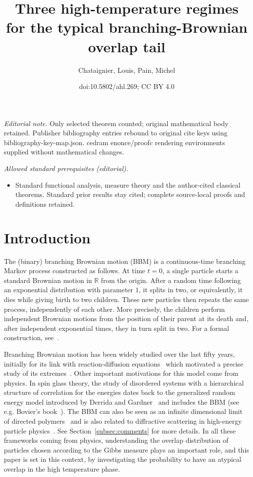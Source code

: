 \documentclass[10pt]{amsart}
\title{Three high-temperature regimes for the typical branching-Brownian overlap tail}
\author{Chataignier, Louis, Pain, Michel}
\date{doi:10.5802/ahl.269; CC BY 4.0}
\theoremstyle{definition}\newtheorem{defi}[theo]{Definition}\newtheorem{rema}[theo]{Remark}\newtheorem{exam}[theo]{Example}\newtheorem{exem}[theo]{Example}\newtheorem{nota}[theo]{Notation}
\newcommand{\R}{\mathbb{R}}
\newcommand\1{\mathds{1}}
\begin{document}
\maketitle
\noindent\textit{Editorial note.} Only selected theorem counted; original mathematical body retained. Publisher bibliography entries rebound to original cite keys using bibliography-key-map.json. cedram enonce/proofc rendering environments supplied without mathematical changes.\par\medskip
\noindent\textit{Allowed standard prerequisites (editorial).}\begin{itemize}
\item Standard functional analysis, measure theory and the author-cited classical theorems. Standard prior results stay cited; complete source-local proofs and definitions retained.
\end{itemize}\medskip

\tableofcontents

\section{Introduction}

The (binary) branching Brownian motion (BBM) is a continuous-time branching Markov process constructed as follows. At time $t = 0$, a single particle starts a standard Brownian motion in $\R$ from the origin. After a random time following an exponential distribution with parameter $1$, it splits in two, or equivalently, it dies while giving birth to two children. These new particles then repeats the same process, independently of each other. More precisely, the children perform independent Brownian motions from the position of their parent at its death and, after independent exponential times, they in turn split in two. For a formal construction, see~\cite{Chauvin1991}.

Branching Brownian motion has been widely studied over the last fifty years, initially for its link with reaction-diffusion equations~\cite{McKean1975} which motivated a precise study of its extremes~\cite{AidekonBerestyckiBrunetShi2013,ArguinBovierKistler2013,Bramson1978,Bramson1983,LalleySellke1987}. Other important motivations for this model come from physics. In spin glass theory, the study of disordered systems with a hierarchical structure of correlation for the energies dates back to the generalized random energy model introduced by Derrida and Gardner~\cite{DerridaGardner1986} and includes the BBM (see e.g. Bovier's book~\cite{Bovier2016}). The BBM can also be seen as an infinite dimensional limit of directed polymers~\cite{DerridaSpohn1988} and is also related to diffractive scattering in high-energy particle physics~\cite{Munier2009}. See Section~\ref{subsec:comments} for more details. In all these frameworks coming from physics, understanding the overlap distribution of particles chosen according to the Gibbs measure plays an important role, and this paper is set in this context, by investigating the probability to have an atypical overlap in the high temperature phase.
\end{document}
